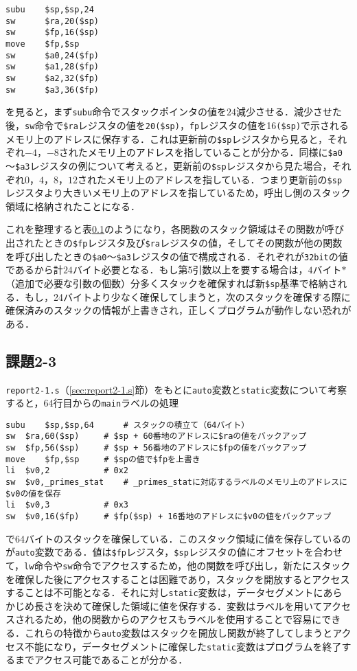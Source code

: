 \begin{Verbatim}[fontsize=\small, baselinestretch=0.8]
subu    $sp,$sp,24
sw      $ra,20($sp)
sw      $fp,16($sp)
move    $fp,$sp
sw      $a0,24($fp)
sw      $a1,28($fp)
sw      $a2,32($fp)
sw      $a3,36($fp)
\end{Verbatim}

を見ると，まず\verb|subu|命令でスタックポインタの値を$24$減少させる．減少させた後，\verb|sw|命令で\verb|$ra|レジスタの値を\verb|20($sp)|，\verb|fp|レジスタの値を16\verb|($sp)|で示されるメモリ上のアドレスに保存する．これは更新前の\verb|$sp|レジスタから見ると，それぞれ$-4$，$-8$されたメモリ上のアドレスを指していることが分かる．同様に\verb|$a0|～\verb|$a3|レジスタの例について考えると，更新前の\verb|$sp|レジスタから見た場合，それぞれ$0$，$4$，$8$，$12$されたメモリ上のアドレスを指している．つまり更新前の\verb|$sp|レジスタより大きいメモリ上のアドレスを指しているため，呼出し側のスタック領域に格納されたことになる．

これを整理すると表\ref{}のようになり，各関数のスタック領域はその関数が呼び出されたときの\verb|$fp|レジスタ及び\verb|$ra|レジスタの値，そしてその関数が他の関数を呼び出したときの\verb|$a0|～\verb|$a3|レジスタの値で構成される．それぞれが\verb|32bit|の値であるから計$24$バイト必要となる．もし第5引数以上を要する場合は，$4$バイト$*$（追加で必要な引数の個数）分多くスタックを確保すれば新\verb|$sp|基準で格納される．もし，24バイトより少なく確保してしまうと，次のスタックを確保する際に確保済みのスタックの情報が上書きされ，正しくプログラムが動作しない恐れがある．


\subsection{課題2-3}
\verb|report2-1.s|（\ref{sec:report2-1.s}節）をもとに\verb|auto|変数と\verb|static|変数について考察すると，64行目からの\verb|main|ラベルの処理
\begin{Verbatim}[fontsize=\small, baselinestretch=0.8]
subu	$sp,$sp,64		# スタックの積立て（64バイト）
sw	$ra,60($sp)		# $sp + 60番地のアドレスに$raの値をバックアップ
sw	$fp,56($sp)		# $sp + 56番地のアドレスに$fpの値をバックアップ
move	$fp,$sp		# $spの値で$fpを上書き
li	$v0,2			# 0x2
sw	$v0,_primes_stat	# _primes_statに対応するラベルのメモリ上のアドレスに$v0の値を保存
li	$v0,3			# 0x3
sw	$v0,16($fp)		# $fp($sp) + 16番地のアドレスに$v0の値をバックアップ
\end{Verbatim}
で64バイトのスタックを確保している．このスタック領域に値を保存しているのが\verb|auto|変数である．値は\verb|$fp|レジスタ，\verb|$sp|レジスタの値にオフセットを合わせて，\verb|lw|命令や\verb|sw|命令でアクセスするため，他の関数を呼び出し，新たにスタックを確保した後にアクセスすることは困難であり，スタックを開放するとアクセスすることは不可能となる．それに対し\verb|static|変数は，データセグメントにあらかじめ長さを決めて確保した領域に値を保存する．変数はラベルを用いてアクセスされるため，他の関数からのアクセスもラベルを使用することで容易にできる．これらの特徴から\verb|auto|変数はスタックを開放し関数が終了してしまうとアクセス不能になり，データセグメントに確保した\verb|static|変数はプログラムを終了するまでアクセス可能であることが分かる．


